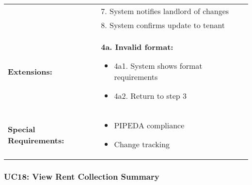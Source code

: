 \documentclass[12pt]{article}
\begin{document}
\begin{tabular}{|p{3cm}|p{11cm}|}
& 7. System notifies landlord of changes \\
& 8. System confirms update to tenant \\
\hline
\textbf{Extensions:} & 
\textbf{4a. Invalid format:}
\begin{itemize}
    \item 4a1. System shows format requirements
    \item 4a2. Return to step 3
\end{itemize} \\
\hline
\textbf{Special Requirements:} & 
\begin{itemize}
    \item PIPEDA compliance
    \item Change tracking
\end{itemize} \\
\hline
\end{tabular}


\subsubsection{UC18: View Rent Collection Summary}
\end{document}
